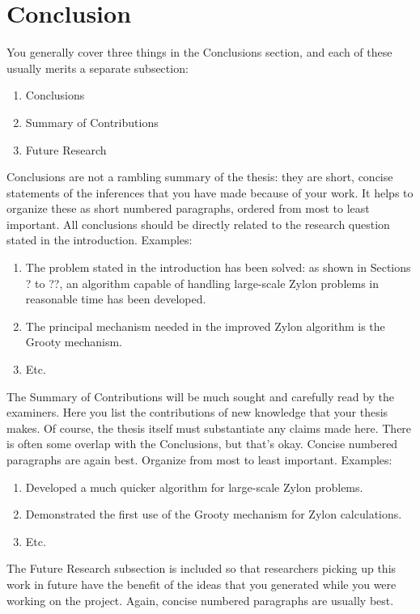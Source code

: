 \chapter{Conclusion}\label{conclusion}


You generally cover three things in the Conclusions section, and each of these usually merits a separate subsection:

\begin{enumerate}
	\item Conclusions
	\item Summary of Contributions
	\item Future Research
\end{enumerate}

Conclusions are not a rambling summary of the thesis: they are short, concise statements of the inferences that you have made because of your work. It helps to organize these as short numbered paragraphs, ordered from most to least important. All conclusions should be directly related to the research question stated in the introduction. Examples:

\begin{enumerate}
	\item The problem stated in the introduction has been solved: as shown in Sections ? to ??, an algorithm capable of handling large-scale Zylon problems in reasonable time has been developed.
	\item The principal mechanism needed in the improved Zylon algorithm is the Grooty mechanism.
	\item Etc.
\end{enumerate}

The Summary of Contributions will be much sought and carefully read by the examiners. Here you list the contributions of new knowledge that your thesis makes. Of course, the thesis itself must substantiate any claims made here. There is often some overlap with the Conclusions, but that's okay. Concise numbered paragraphs are again best. Organize from most to least important. Examples:

\begin{enumerate}
	\item Developed a much quicker algorithm for large-scale Zylon problems.
	\item Demonstrated the first use of the Grooty mechanism for Zylon calculations.
	\item Etc.
\end{enumerate}

The Future Research subsection is included so that researchers picking up this work in future have the benefit of the ideas that you generated while you were working on the project. Again, concise numbered paragraphs are usually best. 